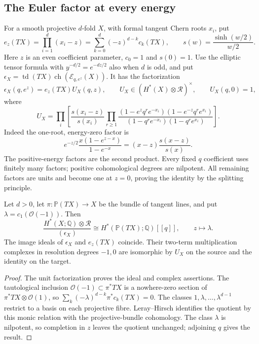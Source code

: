 \subsection{The Euler factor at every energy}

For a smooth projective $d$-fold $X$, with formal tangent
Chern roots $x_i$, put
\[
 e_z(TX)=\prod_{i=1}^d(x_i-z)
       =\sum_{k=0}^d(-z)^{d-k}c_k(TX),
 \qquad s(w)=\frac{\sinh(w/2)}{w/2}.
\]
Here $z$ is an even coefficient parameter, $c_0=1$ and
$s(0)=1$. Use the elliptic tensor formula with
$y^{-d/2}=e^{-dz/2}$ also when $d$ is odd, and put
$\epsilon_X=\operatorname{td}(TX)\operatorname{ch}(\mathcal E_{q,e^z}(X))$.
It has the factorization
\begin{equation}\label{cyprim:eq:Euler-factor}
 \epsilon_X(q,e^z)=e_z(TX)U_X(q,z),
 \qquad U_X\in(H^*(X)\otimes\mathcal R)^\times,
 \qquad U_X(q,0)=1,
\end{equation}
where
\[
 U_X=\prod_i\left[\frac{s(x_i-z)}{s(x_i)}
 \prod_{r\ge1}
 \frac{(1-e^zq^re^{-x_i})(1-e^{-z}q^re^{x_i})}
      {(1-q^re^{-x_i})(1-q^re^{x_i})}\right].
\]
Indeed the one-root, energy-zero factor is
\[
 e^{-z/2}\frac{x(1-e^{z-x})}{1-e^{-x}}
 =(x-z)\frac{s(x-z)}{s(x)}.
\]
The positive-energy factors are the second product.
Every fixed $q$ coefficient uses finitely many factors;
positive cohomological degrees are nilpotent. All remaining
factors are units and become one at $z=0$, proving the
identity by the splitting principle.

\begin{theorem}\label{cyprim:thm:Euler-quotient}
Let $d>0$, let $\pi:\mathbb P(TX)\to X$ be the bundle
of tangent lines, and put $\lambda=c_1(\mathcal O(-1))$. Then
\begin{equation}\label{cyprim:eq:projective-quotient}
 \frac{H^*(X;\mathbb Q)\otimes\mathcal R}{(\epsilon_X)}
 \cong H^*(\mathbb P(TX);\mathbb Q)[[q]],
 \qquad z\longmapsto\lambda.
\end{equation}
The image ideals of $\epsilon_X$ and $e_z(TX)$ coincide.
Their two-term multiplication complexes in resolution degrees
$-1,0$ are isomorphic
by $U_X$ on the source and the identity on the target.
\end{theorem}

\begin{proof}
The unit factorization proves the ideal and complex
assertions. The tautological inclusion
$\mathcal O(-1)\subset\pi^*TX$ is a nowhere-zero section
of $\pi^*TX\otimes\mathcal O(1)$, so
$\sum_k(-\lambda)^{d-k}\pi^*c_k(TX)=0$.
The classes $1,\lambda,\ldots,\lambda^{d-1}$ restrict
to a basis on each projective fibre. Leray--Hirsch
identifies the quotient by this monic relation with the
projective-bundle cohomology. The class $\lambda$ is
nilpotent, so completion in $z$ leaves the quotient
unchanged; adjoining $q$ gives the result.
\end{proof}

